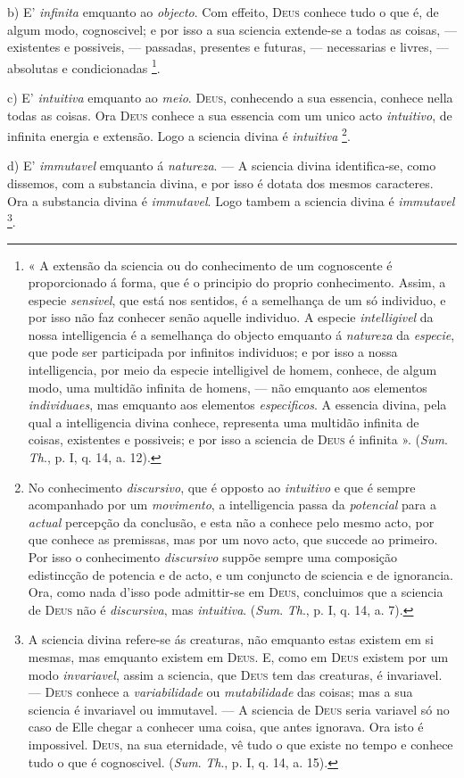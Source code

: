 b) E' \emph{infinita} emquanto ao \emph{objecto}. Com effeito, \textsc{Deus} conhece tudo o que é, de algum modo, cognoscivel; e por isso a sua sciencia extende-se a todas as coisas, --- existentes e possiveis, --- passadas, presentes e futuras, --- necessarias e livres, --- absolutas e condicionadas \footnote{« A extensão da sciencia ou do conhecimento de um cognoscente é proporcionado á forma, que é o principio do proprio conhecimento. Assim, a especie \emph{sensivel}, que está nos sentidos, é a semelhança de um só individuo, e por isso não faz conhecer senão aquelle individuo. A especie \emph{intelligivel} da nossa intelligencia é a semelhança do objecto emquanto á \emph{natureza} da \emph{especie}, que pode ser participada por infinitos individuos; e por isso a nossa intelligencia, por meio da especie intelligivel de homem, conhece, de algum modo, uma multidão infinita de homens, --- não emquanto aos elementos \emph{individuaes}, mas emquanto aos elementos \emph{especificos}. A essencia divina, pela qual a intelligencia divina conhece, representa uma multidão infinita de coisas, existentes e possiveis; e por isso a sciencia de \textsc{Deus} é infinita ». (\emph{Sum}. \emph{Th}., p. I, q. 14, a. 12).}.

c) E' \emph{intuitiva} emquanto ao \emph{meio}. \textsc{Deus}, conhecendo a sua essencia, conhece nella todas as coisas. Ora \textsc{Deus} conhece a sua essencia com um unico acto \emph{intuitivo}, de infinita energia e extensão. Logo a sciencia divina é \emph{intuitiva} \footnote{No conhecimento \emph{discursivo}, que é opposto ao \emph{intuitivo} e que é sempre acompanhado por um \emph{movimento}, a intelligencia passa da \emph{potencial} para a \emph{actual} percepção da conclusão, e esta não a conhece pelo mesmo acto, por que conhece as premissas, mas por um novo acto, que succede ao primeiro. Por isso o conhecimento \emph{discursivo} suppõe sempre uma composição edistincção de potencia e de acto, e um conjuncto de sciencia e de ignorancia. Ora, como nada d'isso pode admittir-se em \textsc{Deus}, concluimos que a sciencia de \textsc{Deus} não é \emph{discursiva}, mas \emph{intuitiva}. (\emph{Sum}. \emph{Th}., p. I, q. 14, a. 7).}.

 d) E' \emph{immutavel} emquanto á \emph{natureza}. --- A sciencia divina identifica-se, como dissemos, com a substancia divina, e por isso é dotata dos mesmos caracteres. Ora a substancia divina é \emph{immutavel}. Logo tambem a sciencia divina é \emph{immutavel} \footnote{A sciencia divina refere-se ás creaturas, não emquanto estas existem em si mesmas, mas emquanto existem em \textsc{Deus}. E, como em \textsc{Deus} existem por um modo \emph{invariavel}, assim a sciencia, que \textsc{Deus} tem das creaturas, é invariavel. --- \textsc{Deus} conhece a \emph{variabilidade} ou \emph{mutabilidade} das coisas; mas a sua sciencia é invariavel ou immutavel. --- A sciencia de \textsc{Deus} seria variavel só no caso de Elle chegar a conhecer uma coisa, que antes ignorava. Ora isto é impossivel. \textsc{Deus}, na sua eternidade, vê tudo o que existe no tempo e conhece tudo o que é cognoscivel. (\emph{Sum}. \emph{Th}., p. I, q. 14, a. 15).}.

